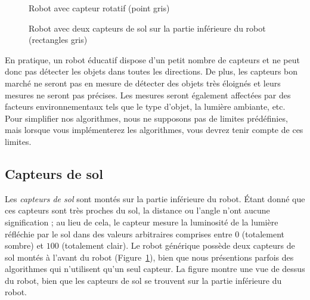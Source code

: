 \begin{figure}
\begin{minipage}{.45\textwidth}
\caption{Robot avec capteur rotatif (point gris)}
\label{fig.generic-sensor}
\end{minipage}
\hspace{\fill}
\begin{minipage}{.45\textwidth}
\caption{Robot avec deux capteurs de sol sur la partie inférieure du robot (rectangles gris)}
\label{fig.generic-ground}
\end{minipage}
\end{figure}

En pratique, un robot éducatif dispose d'un petit nombre de capteurs et ne peut donc pas détecter les objets dans toutes les directions. De plus, les capteurs bon marché ne seront pas en mesure de détecter des objets très éloignés et leurs mesures ne seront pas précises. Les mesures seront également affectées par des facteurs environnementaux tels que le type d'objet, la lumière ambiante, etc. Pour simplifier nos algorithmes, nous ne supposons pas de limites prédéfinies, mais lorsque vous implémenterez les algorithmes, vous devrez tenir compte de ces limites.

\subsection{Capteurs de sol}

Les \emph{capteurs de sol} sont montés sur la partie inférieure du robot. Étant donné que ces capteurs sont très proches du sol, la distance ou l'angle n'ont aucune signification ; au lieu de cela, le capteur mesure la luminosité de la lumière réfléchie par le sol dans des valeurs arbitraires comprises entre $0$ (totalement sombre) et $100$ (totalement clair). Le robot générique possède deux capteurs de sol montés à l'avant du robot (Figure~\ref{fig.generic-ground}), bien que nous présentions parfois des algorithmes qui n'utilisent qu'un seul capteur. La figure montre une vue de dessus du robot, bien que les capteurs de sol se trouvent sur la partie inférieure du robot.


